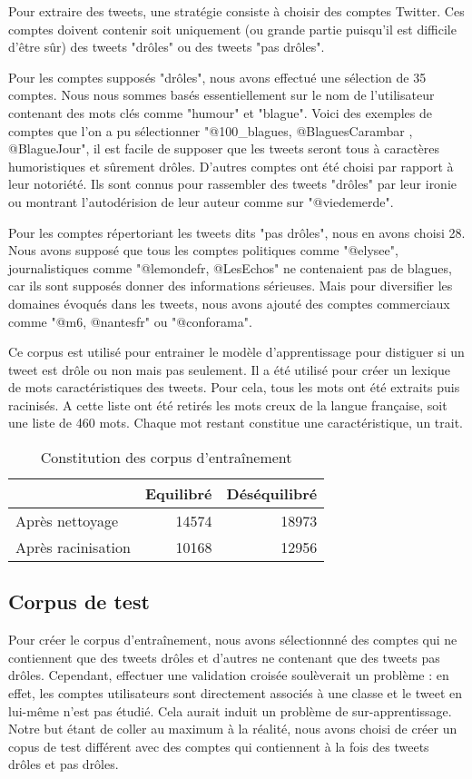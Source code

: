 \documentclass[10pt,a4paper,twoside]{article}
\begin{document}
Pour extraire des tweets, une stratégie consiste à choisir des comptes Twitter. Ces comptes doivent contenir soit uniquement (ou grande partie puisqu'il est difficile d'être sûr) des tweets "drôles" ou des tweets "pas drôles".

Pour les comptes supposés "drôles", nous avons effectué une sélection de 35 comptes. Nous nous sommes basés essentiellement sur le nom de l'utilisateur contenant des mots clés comme "humour" et "blague". Voici des exemples de comptes que l'on a pu sélectionner "@100\_blagues, @BlaguesCarambar , @BlagueJour", il est facile de supposer que les tweets seront tous à caractères humoristiques et sûrement drôles. D'autres comptes ont été choisi par rapport à leur notoriété. Ils sont connus pour rassembler des tweets "drôles" par leur ironie ou montrant l'autodérision de leur auteur comme sur "@viedemerde".

Pour les comptes répertoriant les tweets dits "pas drôles", nous en avons choisi 28. Nous avons supposé que tous les comptes politiques comme "@elysee", journalistiques comme "@lemondefr, @LesEchos" ne contenaient pas de blagues, car ils sont supposés donner des informations sérieuses. Mais pour diversifier les domaines évoqués dans les tweets, nous avons ajouté des comptes commerciaux comme "@m6, @nantesfr" ou "@conforama".

Ce corpus est utilisé pour entrainer le modèle d'apprentissage pour distiguer si un tweet est drôle ou non mais pas seulement. Il a été utilisé pour créer un lexique de mots caractéristiques des tweets. Pour cela, tous les mots ont été extraits puis racinisés. A cette liste ont été retirés les mots creux de la langue française, soit une liste de 460 mots. Chaque mot restant constitue une caractéristique, un trait.



\begin{table}[!h]
\centering
	\begin{tabular}{lrr}
	\toprule
	& Equilibré & Déséquilibré \\
	\midrule
	 Après nettoyage & 14574 & 18973 \\
	 Après racinisation & 10168 & 12956 \\
	\bottomrule
	\end{tabular}
\caption{Constitution des corpus d'entraînement}
\end{table}

\subsection{Corpus de test}
Pour créer le corpus d'entraînement, nous avons sélectionnné des comptes qui ne contiennent que des tweets drôles et d'autres ne contenant que des tweets pas drôles. Cependant, effectuer une validation croisée soulèverait un problème : en effet, les comptes utilisateurs sont directement associés à une classe et le tweet en lui-même n'est pas étudié. Cela aurait induit un problème de sur-apprentissage. Notre but étant de coller au maximum à la réalité, nous avons choisi de créer un copus de test différent avec des comptes qui contiennent à la fois des tweets drôles et pas drôles. 
\end{document}
